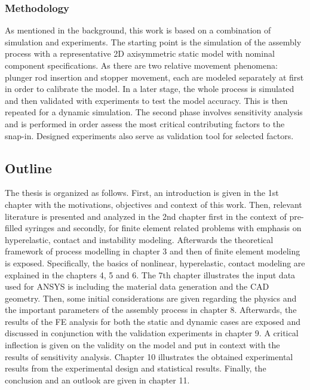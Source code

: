 \subsubsection{Methodology}
As mentioned in the background, this work is based on a combination of simulation and experiments. The starting point is the simulation of the assembly process with a representative 2D axisymmetric static model with nominal component specifications. As there are two relative movement phenomena: plunger rod insertion and stopper movement, each are modeled separately at first in order to calibrate the model. In a later stage, the whole process is simulated and then validated with experiments to test the model accuracy. This is then repeated for a dynamic simulation. The second phase involves sensitivity analysis and is performed in order assess the most critical contributing factors to the snap-in. Designed experiments also serve as validation tool for selected factors.

\newpage
\subsection{Outline}
The thesis is organized as follows. First, an introduction is given in the 1st chapter with the motivations, objectives and context of this work. Then, relevant literature is presented and analyzed in the 2nd chapter first in the context of pre-filled syringes and secondly, for finite element related problems with emphasis on hyperelastic, contact and instability modeling.
Afterwards the theoretical framework of process modelling in chapter 3 and then of finite element modeling is exposed. Specifically, the basics of nonlinear, hyperelastic, contact modeling are explained in the chapters 4, 5 and 6. 
The 7th chapter illustrates  the input data used for ANSYS is including the material data generation and the CAD geometry. 
Then, some initial considerations are given regarding the physics and the important parameters of the assembly process in chapter 8. Afterwards, the results of the FE analysis  for both the static and dynamic cases are exposed and discussed in conjunction with the validation experiments in chapter 9. A critical inflection is given on the validity on the model and put in context with the results of sensitivity analysis. Chapter 10 illustrates the obtained experimental results from the experimental design and statistical results.
Finally, the conclusion and an outlook are given in chapter 11.

